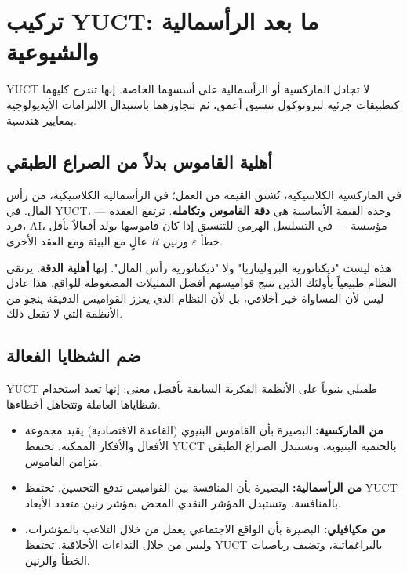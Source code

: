 \documentclass[12pt,a4paper]{article}
\begin{document}
	\section{تركيب YUCT: ما بعد الرأسمالية والشيوعية}
	\label{sec:yuct-synthesis}
	
	YUCT لا تجادل الماركسية أو الرأسمالية على أسسهما الخاصة. إنها تندرج كليهما كتطبيقات جزئية لبروتوكول تنسيق أعمق، ثم تتجاوزهما باستبدال الالتزامات الأيديولوجية بمعايير هندسية.
	
	\subsection{أهلية القاموس بدلاً من الصراع الطبقي}
	
	في الماركسية الكلاسيكية، تُشتق القيمة من العمل؛ في الرأسمالية الكلاسيكية، من رأس المال. في YUCT، وحدة القيمة الأساسية هي \textbf{دقة القاموس وتكامله}. ترتفع العقدة — فرد، AI، مؤسسة — في التسلسل الهرمي للتنسيق إذا كان قاموسها يولد أفعالاً بأقل خطأ \(\varepsilon\) ورنين \(R\) عالٍ مع البيئة ومع العقد الأخرى.
	
	هذه ليست "ديكتاتورية البروليتاريا" ولا "ديكتاتورية رأس المال". إنها \textbf{أهلية الدقة}. يرتقي النظام طبيعياً بأولئك الذين تنتج قواميسهم أفضل التمثيلات المضغوطة للواقع. هذا عادل ليس لأن المساواة خير أخلاقي، بل لأن النظام الذي يعزز القواميس الدقيقة ينجو من الأنظمة التي لا تفعل ذلك.
	
	\subsection{ضم الشظايا الفعالة}
	
	YUCT طفيلي بنيوياً على الأنظمة الفكرية السابقة بأفضل معنى: إنها تعيد استخدام شظاياها العاملة وتتجاهل أخطاءها.
	
	\begin{itemize}[leftmargin=*]
		\item \textbf{من الماركسية:} البصيرة بأن القاموس البنيوي (القاعدة الاقتصادية) يقيد مجموعة الأفعال والأفكار الممكنة. تحتفظ YUCT بالحتمية البنيوية، وتستبدل الصراع الطبقي بتزامن القاموس.
		\item \textbf{من الرأسمالية:} البصيرة بأن المنافسة بين القواميس تدفع التحسين. تحتفظ YUCT بالمنافسة، وتستبدل المؤشر النقدي المحض بمؤشر رنين متعدد الأبعاد.
		\item \textbf{من مكيافيلي:} البصيرة بأن الواقع الاجتماعي يعمل من خلال التلاعب بالمؤشرات، وليس من خلال النداءات الأخلاقية. تحتفظ YUCT بالبراغماتية، وتضيف رياضيات الخطأ والرنين.
	\end{itemize}
	
\end{document}
